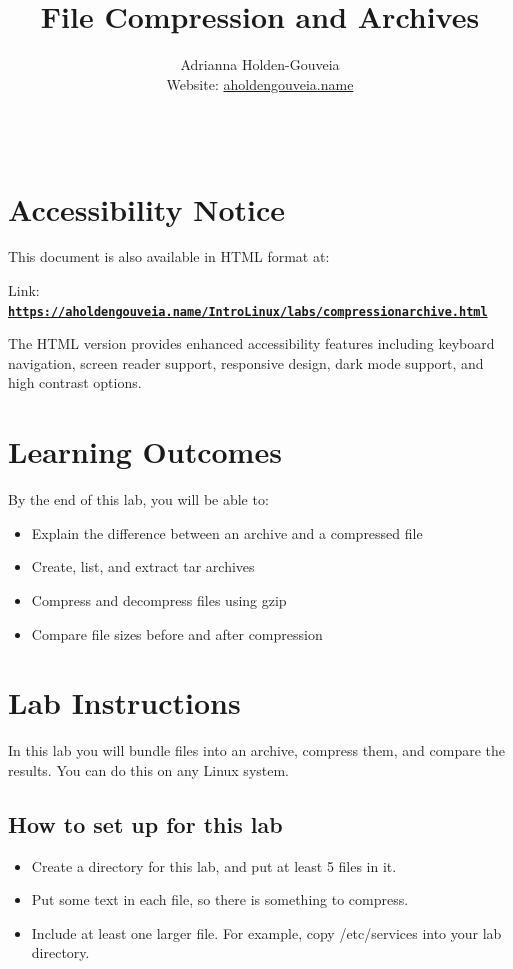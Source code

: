 \documentclass[12pt]{article}
\title{File Compression and Archives}
\author{
        Adrianna Holden-Gouveia \\
        Website: \href{https://aholdengouveia.name}{aholdengouveia.name}\\ 
        \date{\vspace{-5ex}}
        \faGithub {: aholdengouveia} \\
        }
\begin{document}
    

\maketitle

\section*{Accessibility Notice}
This document is also available in HTML format at:

Link: \href{https://aholdengouveia.name/IntroLinux/labs/compressionarchive.html}{\textbf{\nolinkurl{https://aholdengouveia.name/IntroLinux/labs/compressionarchive.html}}}

The HTML version provides enhanced accessibility features including keyboard navigation, screen reader support, responsive design, dark mode support, and high contrast options.



\section*{Learning Outcomes}
By the end of this lab, you will be able to:
\begin{itemize}
    \item Explain the difference between an archive and a compressed file
    \item Create, list, and extract tar archives
    \item Compress and decompress files using gzip
    \item Compare file sizes before and after compression
\end{itemize}

\section*{Lab Instructions}
In this lab you will bundle files into an archive, compress them, and compare the results. You can do this on any Linux system.

\subsection*{How to set up for this lab}
\begin{itemize}
    \item Create a directory for this lab, and put at least 5 files in it.
    \item Put some text in each file, so there is something to compress.
    \item Include at least one larger file. For example, copy /etc/services into your lab directory.
\end{itemize}
\end{document}

